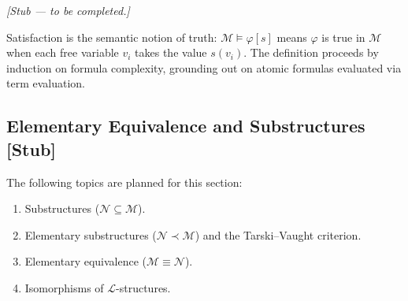\begin{remark*}
\textit{[Stub — to be completed.]}
\end{remark*}

\begin{remark*}[Intuition]
Satisfaction is the semantic notion of truth: $\mathcal{M} \models \varphi[s]$
means $\varphi$ is true in $\mathcal{M}$ when each free variable $v_i$ takes
the value $s(v_i)$.
The definition proceeds by induction on formula complexity,
grounding out on atomic formulas evaluated via term evaluation.
\end{remark*}


\subsection{Elementary Equivalence and Substructures \textnormal{[Stub]}}

\begin{tcolorbox}[colback=gray!6, colframe=gray!40, arc=2pt,
  left=6pt, right=6pt, top=4pt, bottom=4pt,
  title={\small\textbf{Status: Planned}},
  fonttitle=\small\bfseries]
The following topics are planned for this section:
\begin{enumerate}
  \item Substructures ($\mathcal{N} \subseteq \mathcal{M}$).
  \item Elementary substructures ($\mathcal{N} \prec \mathcal{M}$) and
        the Tarski--Vaught criterion.
  \item Elementary equivalence ($\mathcal{M} \equiv \mathcal{N}$).
  \item Isomorphisms of $\mathcal{L}$-structures.
\end{enumerate}
\end{tcolorbox}
